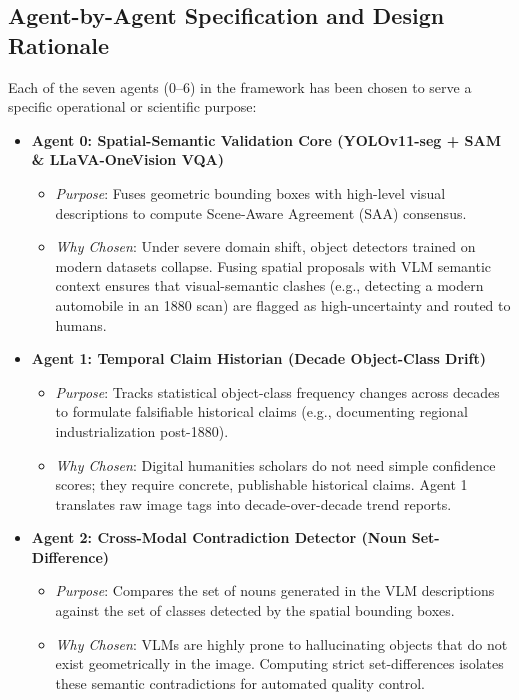 \documentclass[11pt,a4paper]{article}
\begin{document}
\subsection{Agent-by-Agent Specification and Design Rationale}
Each of the seven agents (0--6) in the framework has been chosen to serve a specific operational or scientific purpose:
\begin{itemize}
    \item \textbf{Agent 0: Spatial-Semantic Validation Core (YOLOv11-seg + SAM \& LLaVA-OneVision VQA)}
    \begin{itemize}
        \item \textit{Purpose}: Fuses geometric bounding boxes with high-level visual descriptions to compute Scene-Aware Agreement (SAA) consensus.
        \item \textit{Why Chosen}: Under severe domain shift, object detectors trained on modern datasets collapse. Fusing spatial proposals with VLM semantic context ensures that visual-semantic clashes (e.g., detecting a modern automobile in an 1880 scan) are flagged as high-uncertainty and routed to humans.
    \end{itemize}
    
    \item \textbf{Agent 1: Temporal Claim Historian (Decade Object-Class Drift)}
    \begin{itemize}
        \item \textit{Purpose}: Tracks statistical object-class frequency changes across decades to formulate falsifiable historical claims (e.g., documenting regional industrialization post-1880).
        \item \textit{Why Chosen}: Digital humanities scholars do not need simple confidence scores; they require concrete, publishable historical claims. Agent 1 translates raw image tags into decade-over-decade trend reports.
    \end{itemize}

    \item \textbf{Agent 2: Cross-Modal Contradiction Detector (Noun Set-Difference)}
    \begin{itemize}
        \item \textit{Purpose}: Compares the set of nouns generated in the VLM descriptions against the set of classes detected by the spatial bounding boxes.
        \item \textit{Why Chosen}: VLMs are highly prone to hallucinating objects that do not exist geometrically in the image. Computing strict set-differences isolates these semantic contradictions for automated quality control.
    \end{itemize}


\end{itemize}
\end{document}
